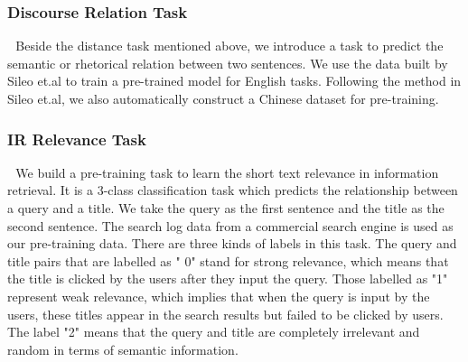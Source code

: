 \documentclass[letterpaper]{article} \usepackage{aaai20}  \usepackage{times}  \usepackage{helvet} \usepackage{courier}  \usepackage[hyphens]{url}  \usepackage{graphicx} \usepackage{makecell}
\begin{document}
\subsubsection{Discourse Relation Task} \,\, 
Beside the distance task mentioned above, we introduce a task to predict the semantic or rhetorical relation between two sentences. We use the data built by Sileo et.al\cite{sileo2019mining} to train a pre-trained model for English tasks. Following the method in Sileo et.al\cite{sileo2019mining}, we also automatically construct a Chinese dataset for pre-training.



\subsubsection{IR Relevance Task}  \,\, 
We build a pre-training task to learn the short text relevance in information retrieval. It is a 3-class classification task which predicts the relationship between a query and a title. We take the query as the first sentence and the title as the second sentence. The search log data from a commercial search engine is used as our pre-training data.
There are three kinds of labels in this task. The query and title pairs that are labelled as " 0" stand for strong relevance, which means that the title is clicked by the users after they input the query. Those labelled as "1" represent weak relevance, which implies that when the query is input by the users, these titles appear in the search results but failed to be clicked by users. The label "2" means that the query and title are completely irrelevant and random in terms of semantic information.
\end{document}
